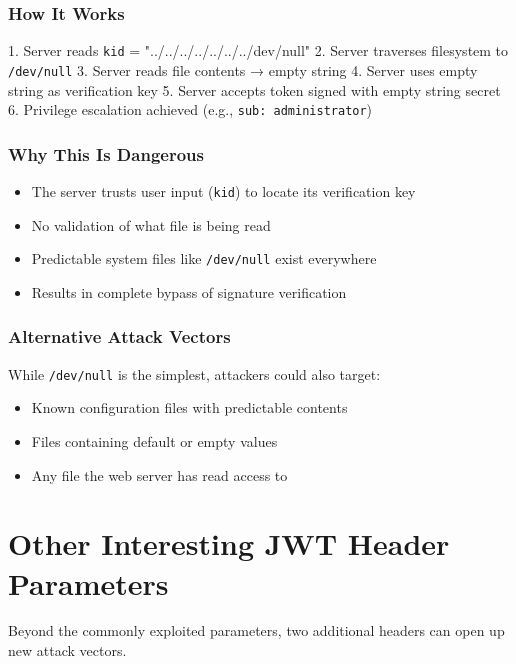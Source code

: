 \documentclass{article}
\begin{document}
\subsubsection{How It Works}

\begin{attackbox}
1. Server reads \texttt{kid} = "../../../../../../../dev/null"
2. Server traverses filesystem to \texttt{/dev/null}
3. Server reads file contents → empty string
4. Server uses empty string as verification key
5. Server accepts token signed with empty string secret
6. Privilege escalation achieved (e.g., \texttt{sub: administrator})
\end{attackbox}

\subsubsection{Why This Is Dangerous}

\begin{itemize}
    \item The server trusts user input (\texttt{kid}) to locate its verification key
    \item No validation of what file is being read
    \item Predictable system files like \texttt{/dev/null} exist everywhere
    \item Results in complete bypass of signature verification
\end{itemize}

\subsubsection{Alternative Attack Vectors}

While \texttt{/dev/null} is the simplest, attackers could also target:
\begin{itemize}
    \item Known configuration files with predictable contents
    \item Files containing default or empty values
    \item Any file the web server has read access to
\end{itemize}

\section{Other Interesting JWT Header Parameters}

Beyond the commonly exploited parameters, two additional headers can open up new attack vectors.
\end{document}
